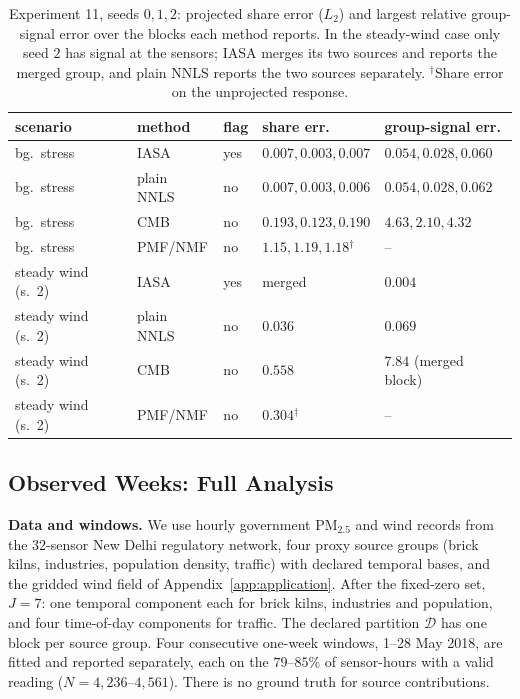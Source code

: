 \begin{table}[t]
\centering
\footnotesize
\setlength{\tabcolsep}{3pt}
\caption{Experiment 11, seeds \(0,1,2\): projected share error (\(L_2\)) and largest
relative group-signal error over the blocks each method reports.  In the steady-wind case only
seed \(2\) has signal at the sensors; IASA merges its two sources and reports the merged
group, and plain NNLS reports the two sources separately.  \(^\dagger\)Share error on the
unprojected response.}
\label{tab:results_baselines_full}
\begin{tabular}{lllll}
\toprule
scenario & method & flag & share err. & group-signal err. \\
\midrule
bg.\ stress & IASA       & yes & \(0.007,0.003,0.007\) & \(0.054,0.028,0.060\) \\
bg.\ stress & plain NNLS & no  & \(0.007,0.003,0.006\) & \(0.054,0.028,0.062\) \\
bg.\ stress & CMB        & no  & \(0.193,0.123,0.190\) & \(4.63,2.10,4.32\) \\
bg.\ stress & PMF/NMF    & no  & \(1.15,1.19,1.18\)\(^\dagger\) & -- \\
\midrule
steady wind (s.\ 2) & IASA       & yes & merged & \(0.004\) \\
steady wind (s.\ 2) & plain NNLS & no  & \(0.036\) & \(0.069\) \\
steady wind (s.\ 2) & CMB        & no  & \(0.558\) & \(7.84\) (merged block) \\
steady wind (s.\ 2) & PMF/NMF    & no  & \(0.304\)\(^\dagger\) & -- \\
\bottomrule
\end{tabular}
\end{table}

\subsection{Observed Weeks: Full Analysis}
\label{app:observed_full}

\noindent\textbf{Data and windows.}
We use hourly government PM\(_{2.5}\) and wind records \citep{cpcb,cpcb_portal} from
the 32-sensor New Delhi regulatory network, four proxy source groups (brick kilns,
industries, population density, traffic) with declared temporal bases, and the
gridded wind field of Appendix~\ref{app:application}.  After the fixed-zero set,
\(J=7\): one temporal component each for brick kilns, industries and population, and
four time-of-day components for traffic.  The declared partition \(\mathcal D\) has
one block per source group.  Four consecutive one-week windows, 1--28 May 2018, are
fitted and reported separately, each on the \(79\)--\(85\%\) of sensor-hours with a
valid reading (\(N=4{,}236\)--\(4{,}561\)).  There is no ground truth for source
contributions.

